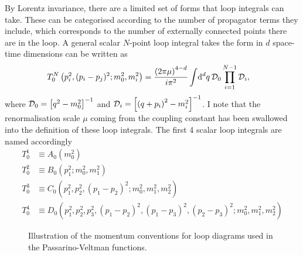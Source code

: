 \documentclass[../main.tex]{subfiles}
\begin{document}
By Lorentz invariance, there are a limited set of forms that loop integrals can take.
These can be categorised according to the number of propagator terms they include, which corresponds to the number of externally connected points there are in the loop.
A general scalar \(N\)-point loop integral takes the form in \(d\) space-time dimensions can be written as
\begin{align}
  T^N_0\left(p_i^2, (p_i-p_j)^2; m_0^2, m_i^2\right) & = \frac{\left(2\pi
      \mu\right)^{4-d}}{i \pi^2} \int \!\mathrm{d}^d q\, \mathcal{D}_0
  \prod_{i=1}^{N-1}
  \mathcal{D}_i,
\end{align}
where \(\mathcal{D}_0 = \left[q^2-m_0^2\right]^{-1}\) and \(\mathcal{D}_i =
\left[\left(q+p_i\right)^2-m_i^2\right]^{-1}\).
I note that the renormalisation scale \(\mu\) coming from the coupling constant has been swallowed into the definition of these loop integrals.
The first 4 scalar loop integrals are named accordingly
\begin{align}
  T^1_0 & \equiv A_0(m_0^2)
  \\
  T^2_0 & \equiv B_0(p_1^2; m_0^2, m_1^2)
  \\
  T^3_0 & \equiv C_0(p_1^2, p_2^2, (p_1-p_2)^2; m_0^2, m_1^2, m_2^2)
  \\
  T^4_0 & \equiv D_0(p_1^2, p_2^2, p_3^2, (p_1-p_2)^2, (p_1-p_3)^2,
  (p_2-p_3)^2; m_0^2, m_1^2, m_2^2)
\end{align}

\begin{figure}[ht!]
  \centering
  \begin{subfigure}{0.49\linewidth}
    \centering
    \caption{}
    \label{qft:fig:PV_triloop_conventions}
  \end{subfigure}
  \begin{subfigure}{0.49\linewidth}
    \centering
    \caption{}
    \label{qft:fig:PV_boxloop_conventions}
  \end{subfigure}
  \caption{Illustration of the momentum conventions for loop diagrams used in
    the Passarino-Veltman functions.}
  \label{qft:fig:PV_loop_conventions}
\end{figure}
\end{document}
